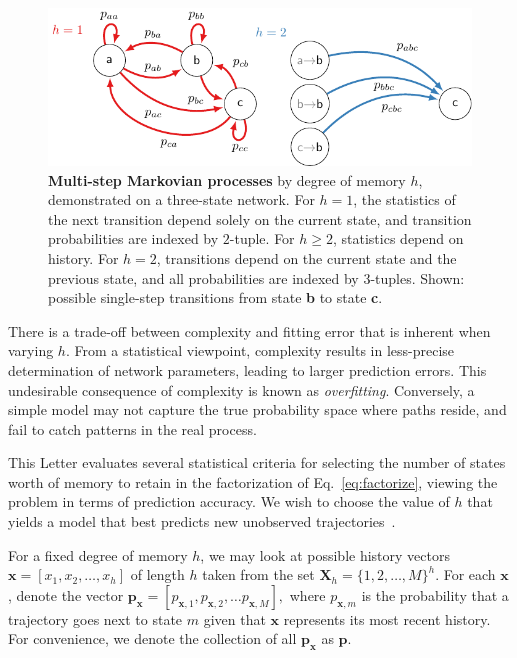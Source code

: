 \documentclass[prl,twocolumn,groupedaddress]{revtex4-1}
\newcommand{\bx}{\mathbf{x}}
\newcommand{\bp}{\mathbf{p}}
\renewcommand{\bf}[1]{\textbf{#1}}
\begin{document}
  \begin{figure}
 \includegraphics[width=\linewidth]{fig1b}
 \caption{\bf{Multi-step Markovian processes}  by degree of memory $h$, demonstrated on a three-state network. For $h=1$, the statistics of the next transition depend solely on the current state, and transition probabilities are indexed by  $2$-tuple. For $h\geq2$, statistics depend on history. For $h=2$, transitions depend on the
 current state and the previous state, and all probabilities are indexed by $3$-tuples.  Shown:  possible single-step transitions from state \bf{b} to state \bf{c}.  } \label{fig:fig1}
 \end{figure}

There is a trade-off between complexity and fitting error that is inherent when varying $h$. From a statistical viewpoint, complexity results in less-precise determination of network parameters, leading to larger prediction errors. This undesirable consequence of complexity is known as \emph{overfitting}. Conversely, a simple model may not capture the true probability space where paths reside, and fail to catch patterns in the real process.

This Letter evaluates several statistical criteria for selecting the number of states worth of memory to retain in the factorization of Eq.~\ref{eq:factorize}, viewing the problem in terms of prediction accuracy. 
We wish to choose the value of $h$ that yields a model that best predicts new unobserved trajectories~\cite{claeskens2008model}. 

 For a fixed degree of memory $h$,
we may look at possible history vectors $\bx = [x_1,x_2,\ldots,x_h]$ of length $h$ taken from the set $\mathbf{X}_h = \{1,2,\ldots,M \}^h$. For each $\bx$, denote the vector $\mathbf{p}_{\bx} = [p_{\bx,1},p_{\bx,2},\ldots{p}_{\bx,M}],$ where $p_{\bx,m}$ is the probability that a trajectory goes next to state $m$ given that $\bx$ represents its most recent history. For convenience, we denote the collection of all $\bp_\bx$ as $\mathbf{p}$.  
\end{document}
